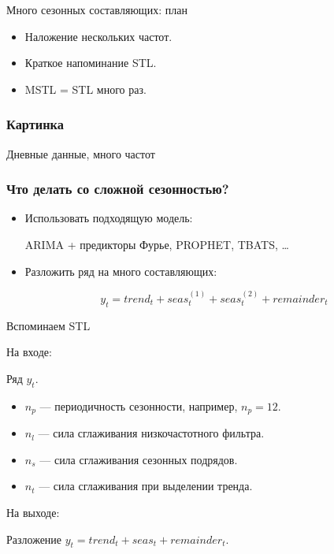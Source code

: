 
\begin{frame} %


\end{frame}



\begin{frame}{Много сезонных составляющих: план}
  \begin{itemize}[<+->]
    \item Наложение нескольких частот.
    \item Краткое напоминание STL.
    \item MSTL = STL много раз.
  \end{itemize}

\end{frame}

\begin{frame}
  \frametitle{Картинка}

  Дневные данные, много частот
  
\end{frame}

\begin{frame}
  \frametitle{Что делать со сложной сезонностью?}

  \begin{itemize}[<+->]
    \item Использовать \alert{подходящую} модель:
    
    ARIMA + предикторы Фурье, PROPHET, TBATS, \ldots

    \item Разложить ряд на \alert{много} составляющих:
    
    \[
      y_t = trend_t + seas_t^{(1)} + seas_t^{(2)} + remainder_t
    \]
  \end{itemize}
  

\end{frame}


\begin{frame}{Вспоминаем STL}

  \alert{На входе:}
  
  Ряд $y_t$.
  \pause
  \begin{itemize}
    \item $n_p$ — периодичность сезонности, например, $n_p=12$. \pause 
    \item $n_l$ — сила сглаживания низкочастотного фильтра.   \pause
    \item $n_s$ — сила сглаживания сезонных подрядов. \pause
    \item $n_t$ — сила сглаживания при выделении тренда.     
  \end{itemize}

  \pause
  \alert{На выходе:}
  
  Разложение $y_t = trend_t + seas_t + remainder_t$.  
\end{frame}
  
